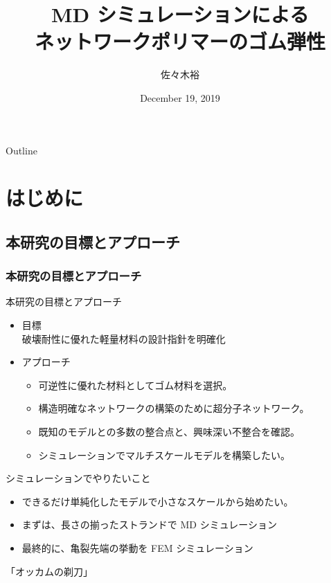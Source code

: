 \documentclass[11pt, dvipdfmx]{beamer}
\title
[MD シミュレーションによるネットワークポリマーのゴム弾性]
{MD シミュレーションによる\\ネットワークポリマーのゴム弾性}
\author[東亞合成　佐々木]{佐々木裕}
\institute[東亞合成]{東亞合成}
\date{December 19, 2019}
\begin{document}
\begin{frame}\frametitle{}
	\titlepage
\end{frame}
\section*{}
%
\begin{frame}
{Outline}
	\tableofcontents
\end{frame}
\section{はじめに}
\subsection{本研究の目標とアプローチ}
\begin{frame}
\frametitle{本研究の目標とアプローチ}
\vspace{-2mm}
\begin{exampleblock}{本研究の目標とアプローチ}
\begin{itemize}
\item
目標\\
破壊耐性に優れた軽量材料の設計指針を明確化
\item
アプローチ
	\begin{itemize}
	\item
	可逆性に優れた材料としてゴム材料を選択。
	\item
	構造明確なネットワークの構築のために超分子ネットワーク。
	\item
	既知のモデルとの\color{red}多数の整合点と、興味深い不整合\color{black}を確認。
	\item
	\color{red}シミュレーションでマルチスケールモデル\color{black}を構築したい。
	\end{itemize}
\end{itemize}
\end{exampleblock}
\vspace{-2mm}
\begin{alertblock}{シミュレーションでやりたいこと}
\begin{itemize}
\item
できるだけ\alert{単純化したモデルで小さなスケール}から始めたい。
\item
まずは、長さの揃ったストランドで MD シミュレーション
\item
最終的に、亀裂先端の挙動を FEM シミュレーション
\end{itemize}
\centering
{\color{red}\Large「オッカムの剃刀」}
\end{alertblock}
\end{frame}
\end{document}
